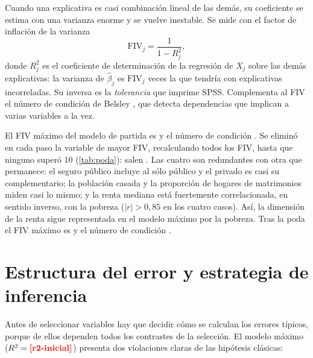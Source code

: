 Cuando una explicativa es casi combinación lineal de las demás, su coeficiente se estima con una
varianza enorme y se vuelve inestable. Se mide con el factor de inflación de la varianza
\[
\mathrm{FIV}_j=\frac{1}{1-R_j^2},
\]
donde $R_j^2$ es el coeficiente de determinación de la regresión de $X_j$ sobre las demás
explicativas: la varianza de $\hat\beta_j$ es $\mathrm{FIV}_j$ veces la que tendría con
explicativas incorreladas. Su inversa es la \emph{tolerancia} que imprime SPSS. Complementa al
FIV el número de condición de Belsley \parencite{belsley1980}, que detecta dependencias que
implican a varias variables a la vez.

El FIV máximo del modelo de partida es  y el número de condición
. Se eliminó en cada paso la variable de mayor FIV, recalculando todos los FIV,
hasta que ninguno superó 10 (\cref{tab:poda}): salen . Las cuatro son redundantes
con otra que permanece: el seguro público incluye al sólo público y el privado es casi su
complementario; la población casada y la proporción de hogares de matrimonios miden casi lo mismo;
y la renta mediana está fuertemente correlacionada, en sentido inverso, con la pobreza
($|r|>0{,}85$ en los cuatro casos). Así, la dimensión de la renta sigue representada en el
modelo máximo por la pobreza.
Tras la poda el FIV máximo es  y el número de condición .




\section{Estructura del error y estrategia de inferencia}\label{sec:estructura-error}

Antes de seleccionar variables hay que decidir cómo se calculan los errores típicos, porque de
ellos dependen todos los contrastes de la selección. El modelo máximo
($R^2=\res{r2-inicial}$) presenta dos violaciones claras de las hipótesis clásicas:

